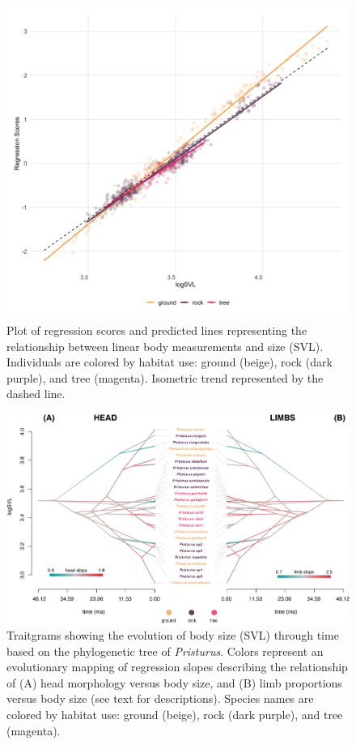 \documentclass[
  11pt,
]{article}
\begin{document}
\newpage

\begin{figure}
\includegraphics[width=1\linewidth]{Figs/figure_2_ggplot} \caption{Plot of regression scores and predicted lines representing the relationship between linear body measurements and size (SVL). Individuals are colored by habitat use: ground (beige), rock (dark purple), and tree (magenta). Isometric trend represented by the dashed line.}\label{fig:unnamed-chunk-4}
\end{figure}

\newpage

\begin{figure}
\includegraphics[width=1\linewidth]{Figs/figure_phenograms} \caption{Traitgrams showing the evolution of body size (SVL) through time based on the phylogenetic tree of \textit{Pristurus}. Colors represent an evolutionary mapping of regression slopes describing the relationship of (A) head morphology versus body size, and (B) limb proportions versus body size (see text for descriptions). Species names are colored by habitat use: ground (beige), rock (dark purple), and tree (magenta).}\label{fig:unnamed-chunk-5}
\end{figure}
\end{document}

